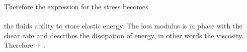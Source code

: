 \documentclass[11pt]{article}
\begin{document}
Therefore the expression for the stress becomes
\nonumber \\
\nonumber \\
the fluids ability to store elastic energy. The loss modulus is in phase with 
the shear rate and describes the dissipation of energy, in other words the 
viscosity. Therefore
%
\omega + .
\end{document}
